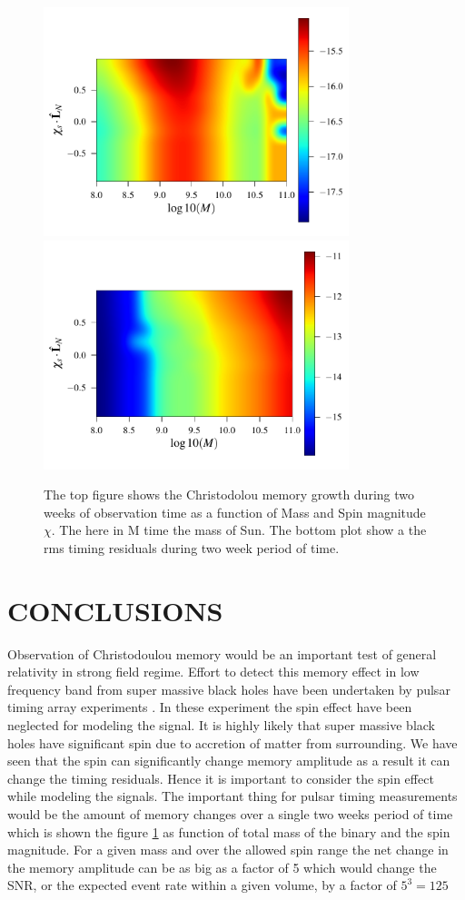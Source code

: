 \documentclass[twocolumn,showpacs,aps,prd,nobibnotes,floatfix]{revtex4-1}
\begin{document}
\begin{widetext}
\begin{figure}
	\includegraphics[width=3.5in]{../plots/PlotfromMathematicaData/MemoryResSpinvsMass14Days.pdf}
	\includegraphics[width=3.5in]{../plots/PlotfromMathematicaData/MemoryResSpinvsMass1825Days.pdf}
	\caption{The top figure shows the Christodolou memory growth during two weeks of observation time as a function of Mass and Spin magnitude $\chi$. The here in M time the mass of Sun. The bottom plot show a the rms timing residuals during two week period of time.}
	\label{fig:MemoryMassVsSpin}
\end{figure}
\end{widetext}
\section{CONCLUSIONS}
Observation of Christodoulou memory would be an important test of general relativity in strong field regime. Effort to detect this memory effect in low frequency band from super massive black holes have been undertaken by pulsar timing array experiments \cite{Pshirkov2010}. In these experiment the spin effect have been neglected for modeling the signal. It is highly likely that super massive black holes have significant spin due to accretion of matter from surrounding. We have seen that the spin can significantly change memory amplitude as a result it can change the timing residuals. Hence it is important to consider the spin effect while modeling the signals. The important thing for pulsar timing measurements would be the amount of memory changes over a single two weeks period of time which is shown the figure \ref{fig:MemoryMassVsSpin} as function of total mass of the binary and the spin magnitude. For a given mass and over the allowed spin range the net change in the memory amplitude can be as big as a factor of 5 which would change the SNR, or the expected event rate within a given volume, by a factor of $5^{3}=125$
\end{document}
